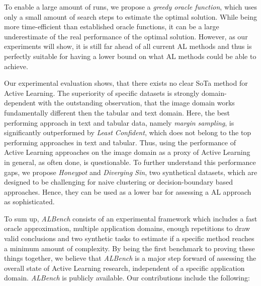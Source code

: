 \documentclass[]{article}
\begin{document}
To enable a large amount of runs, we propose a \emph{greedy oracle
function}, which uses only a small amount of search steps to estimate the
optimal solution. While being more time-efficient than established oracle
functions, it can be a large underestimate of the real performance of the
optimal solution. However, as our experiments will show, it is still far ahead
of all current AL methods and thus is perfectly suitable for having a lower
bound on what AL methods could be able to achieve.

Our experimental evaluation shows, that there exists no clear SoTa
method for Active Learning. The superiority of specific datasets is strongly
domain-dependent with the outstanding observation, that the image domain works
fundamentally different then the tabular and text domain. Here, the best
performing approach in text and tabular data, namely \emph{margin sampling}, is
significantly outperformed by \emph{Least Confident}, which does not belong to
the top performing approaches in text and tabular. Thus, using the performance
of Active Learning approaches on the image domain as a proxy of Active Learning
in general, as often done, is questionable. To further understand this
performance gaps, we propose \emph{Honeypot} and \emph{Diverging Sin}, two
synthetical datasets, which are designed to be challenging for naive clustering
or decision-boundary based approaches. Hence, they can be used as a lower bar
for assessing a AL approach as sophisticated.

To sum up, \emph{ALBench} consists of an experimental framework which includes a
fast oracle approximation, multiple application domains, enough repetitions to
draw valid conclusions and two synthetic tasks to estimate if a specific method
reaches a minimum amount of complexity. By being the first benchmark to proving
these things together, we believe that \emph{ALBench} is a major step forward of
assessing the overall state of Active Learning research, independent of a
specific application domain. \emph{ALBench} is publicly available.
Our contributions include the following:
\end{document}
